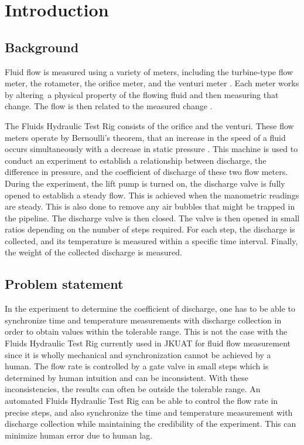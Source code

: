 \section{Introduction}
\label{sec:introduction}
\subsection{Background}

Fluid flow is measured using a variety of meters, including the turbine-type flow meter, the rotameter, the orifice meter, and the venturi meter \cite{pereira2009flow}. Each meter works by altering a physical property of the flowing fluid and then measuring that change. The flow is then related to the measured change \cite{miller1983flow}.
\par
The Fluids Hydraulic Test Rig consists of the orifice and the venturi. These flow meters operate by Bernoulli’s theorem, that an increase in the speed of a fluid occurs simultaneously with a decrease in static pressure \cite{pockman1940bernoulli}. This machine is used to conduct an experiment to establish a relationship between discharge, the difference in pressure, and the coefficient of discharge of these two flow meters. 
During the experiment, the lift pump is turned on, the discharge valve is fully opened to establish a steady flow. This is achieved when the manometric readings are steady. This is also done to remove any air bubbles that might be trapped in the pipeline. The discharge valve is then closed. The valve is then opened in small ratios depending on the number of steps required. For each step, the discharge is collected, and its temperature is measured within a specific time interval. Finally, the weight of the collected discharge is measured.

\subsection{Problem statement}

In the experiment to determine the coefficient of discharge, one has to be able to synchronize time and temperature measurements with discharge collection in order to obtain values within the tolerable range. This is not the case with the Fluids Hydraulic Test Rig currently used in JKUAT for fluid flow measurement since it is wholly mechanical and synchronization cannot be achieved by a human. The flow rate is controlled by a gate valve in small steps which is determined by human intuition and can be inconsistent. With these inconsistencies, the results can often be outside the tolerable range. An automated Fluids Hydraulic Test Rig can be able to control the flow rate in precise steps, and also synchronize the time and temperature measurement with discharge collection while maintaining the credibility of the experiment. This can minimize human error due to human lag.  


